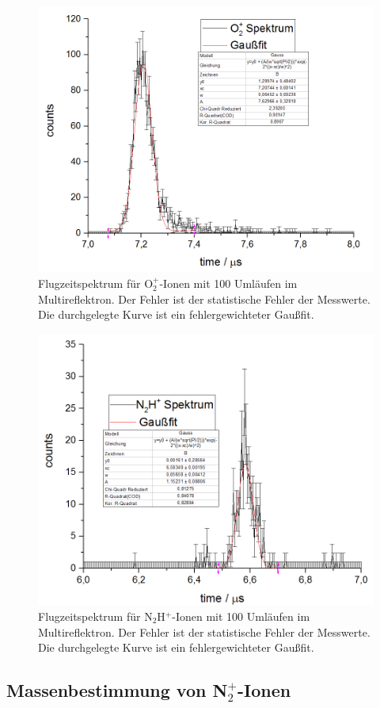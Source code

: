 \documentclass[numbers=noenddot,a4paper,notitlepage,twoside,BCOR15mm]{scrartcl}
\begin{document}
				\begin{figure}[!h]
					\centering
					\includegraphics[width=0.6\columnwidth]{pics/O2}
					\caption{Flugzeitspektrum für O${}_2^+$-Ionen mit 100 Umläufen im Multireflektron. Der Fehler ist der statistische Fehler der Messwerte. Die durchgelegte Kurve ist ein fehlergewichteter Gaußfit.}
					\label{abb:O2}
				\end{figure}
				
				\begin{figure}[!h]
					\centering
					\includegraphics[width=0.6\columnwidth]{pics/N2H}
					\caption{Flugzeitspektrum für N${}_2$H$^+$-Ionen mit 100 Umläufen im Multireflektron. Der Fehler ist der statistische Fehler der Messwerte. Die durchgelegte Kurve ist ein fehlergewichteter Gaußfit.}
					\label{abb:N2H}
				\end{figure}
				\newpage
	
	\subsection{Massenbestimmung von N$_2^+$-Ionen}
		
\end{document}
